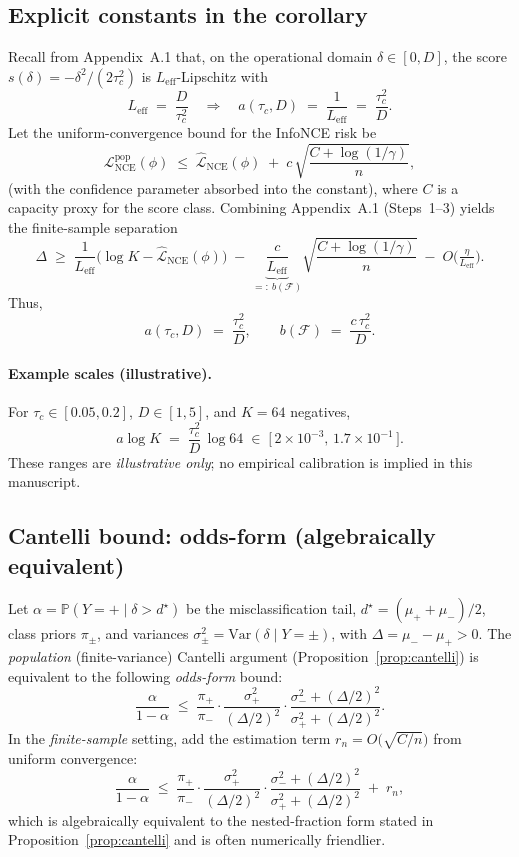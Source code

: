 \documentclass[11pt]{article}
\begin{document}
\subsection{Explicit constants in the corollary}
\label{app:constants}
Recall from Appendix~A.1 that, on the operational domain $\delta\in[0,D]$,
the score $s(\delta)=-\delta^2/(2\tau_c^2)$ is $L_{\mathrm{eff}}$-Lipschitz with
\[
L_{\mathrm{eff}} \;=\; \frac{D}{\tau_c^2}
\quad\Rightarrow\quad
a(\tau_c,D) \;=\; \frac{1}{L_{\mathrm{eff}}} \;=\; \frac{\tau_c^2}{D}.
\]
Let the uniform-convergence bound for the InfoNCE risk be
\[
\mathcal{L}_{\mathrm{NCE}}^{\mathrm{pop}}(\phi)
\;\le\;
\widehat{\mathcal{L}}_{\mathrm{NCE}}(\phi) \;+\; c\,\sqrt{\frac{C+\log(1/\gamma)}{n}},
\]
(with the confidence parameter absorbed into the constant), where $C$ is a capacity proxy for the score class. Combining Appendix~A.1 (Steps~1–3) yields the finite-sample separation
\[
\Delta \;\ge\; \frac{1}{L_{\mathrm{eff}}}\Big(\log K - \widehat{\mathcal{L}}_{\mathrm{NCE}}(\phi)\Big)
\;-\; \underbrace{\frac{c}{L_{\mathrm{eff}}}}_{=:~b(\mathcal{F})}\sqrt{\frac{C+\log(1/\gamma)}{n}}
\;-\; O\!\Big(\tfrac{\eta}{L_{\mathrm{eff}}}\Big).
\]
Thus,
\[
a(\tau_c,D) \;=\; \frac{\tau_c^2}{D},
\qquad
b(\mathcal{F}) \;=\; \frac{c\,\tau_c^2}{D}.
\]

\paragraph{Example scales (illustrative).}
For $\tau_c\in[0.05,0.2]$, $D\in[1,5]$, and $K=64$ negatives,
\[
a\log K \;=\; \frac{\tau_c^2}{D}\,\log 64 \;\in\; \big[\,2\times 10^{-3},\,1.7\times 10^{-1}\,\big].
\]
These ranges are \emph{illustrative only}; no empirical calibration is implied in this manuscript.


\subsection{Cantelli bound: odds-form (algebraically equivalent)}
\label{app:odds}
Let $\alpha=\mathbb{P}(Y=+\mid \delta>d^\star)$ be the misclassification tail,
$d^\star=(\mu_++\mu_-)/2$, class priors $\pi_\pm$, and variances
$\sigma_\pm^2=\mathrm{Var}(\delta\mid Y=\pm)$, with $\Delta=\mu_--\mu_+>0$.
The \emph{population} (finite-variance) Cantelli argument (Proposition~\ref{prop:cantelli}) is equivalent to the following \emph{odds-form} bound:
\[
\frac{\alpha}{1-\alpha}
\;\le\;
\frac{\pi_+}{\pi_-}\cdot
\frac{\sigma_+^2}{(\Delta/2)^2}\cdot
\frac{\sigma_-^2+(\Delta/2)^2}{\sigma_+^2+(\Delta/2)^2}.
\]
In the \emph{finite-sample} setting, add the estimation term $r_n=O\!\big(\sqrt{C/n}\big)$ from uniform convergence:
\[
\frac{\alpha}{1-\alpha}
\;\le\;
\frac{\pi_+}{\pi_-}\cdot
\frac{\sigma_+^2}{(\Delta/2)^2}\cdot
\frac{\sigma_-^2+(\Delta/2)^2}{\sigma_+^2+(\Delta/2)^2}
\;+\; r_n,
\]
which is algebraically equivalent to the nested-fraction form stated in Proposition~\ref{prop:cantelli} and is often numerically friendlier.
\end{document}
